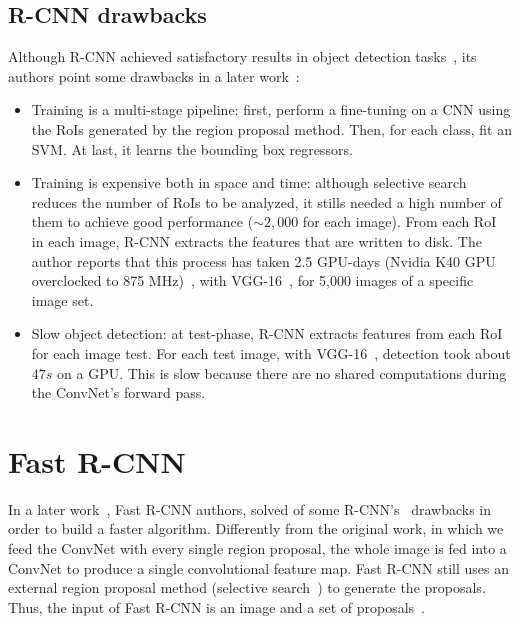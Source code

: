 \subsection{R-CNN drawbacks}
%
Although R-CNN achieved satisfactory results in object detection tasks~\cite{Girshick2016RCNN},
its authors point some drawbacks in a later work~\cite{Girshick2015}:
%
\begin{itemize}
 \item Training is a multi-stage pipeline:
 first, perform a fine-tuning on a CNN using the RoIs generated by the region proposal method.
 Then, for each class, fit an SVM.
 At last, it learns the bounding box regressors.
 \item Training is expensive both in space and time:
 although selective search reduces the number of RoIs to be analyzed, it stills needed a high number of them to achieve good performance ($\sim2,000$ for each image).
 From each RoI in each image, R-CNN extracts the features that are written to disk.
 The author reports that this process has taken 2.5 GPU-days (Nvidia K40 GPU overclocked to 875 MHz)~\cite{Girshick2015}, with VGG-16~\cite{Simonyan2015VGG}, for 5,000 images of a specific image set.
 \item Slow object detection: at test-phase, R-CNN extracts features from each RoI for each image test.
 For each test image, with VGG-16~\cite{Simonyan2015VGG}, detection took about $47s$  on a GPU.
 This is slow because there are no shared computations during the ConvNet's forward pass.
\end{itemize}


\section{Fast R-CNN}\label{sec:fast_r-cnn}
%
In a later work~\cite{Girshick2015}, Fast R-CNN authors, solved of some R-CNN's~\cite{Girshick2016RCNN} drawbacks in order to build a faster algorithm.
Differently from the original work, in which we feed the ConvNet with every single region proposal,
the whole image is fed into a ConvNet to produce a single convolutional feature map.
Fast R-CNN still uses an external region proposal method (\eg selective search~\cite{Uijlings2013ss}) to generate the proposals.
Thus, the input of Fast R-CNN is an image and a set of proposals~\cite{Girshick2015}.

